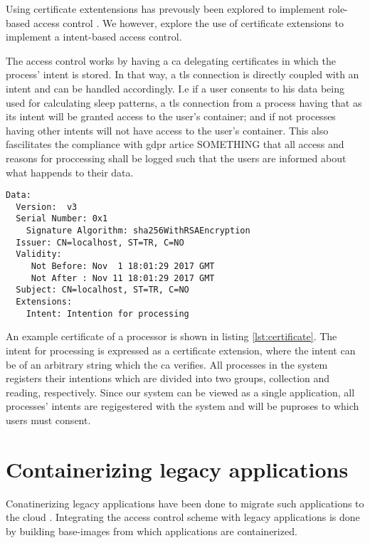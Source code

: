 \documentclass[USenglish]{uit-thesis}
\begin{document}
Using certificate extentensions has prevously been explored to implement role-based access control \cite{7095802, 1189190}.
We however, explore the use of certificate extensions to implement a intent-based access control.

The access control works by having a \gls{ca} delegating certificates in which the process'
intent is stored.
In that way, a \gls{tls} connection is directly coupled with an intent and can be
handled accordingly.
I.e if a user consents to his data being used for calculating sleep patterns, a \gls{tls}
connection from a process having that as its intent will be granted access to the user's
container; and if not processes having other intents will not have access to the user's container.
This also fascilitates the compliance with \gls{gdpr} artice SOMETHING that all access and reasons
for proccessing shall be logged such that the users are informed about what happends to their data.

\begin{lstlisting}[frame=single, caption={Intent certificate. Some fields are left out for brievity}, label={lst:certificate}]
    Data:
  Version:  v3
  Serial Number: 0x1
    Signature Algorithm: sha256WithRSAEncryption
  Issuer: CN=localhost, ST=TR, C=NO
  Validity:
     Not Before: Nov  1 18:01:29 2017 GMT
     Not After : Nov 11 18:01:29 2017 GMT
  Subject: CN=localhost, ST=TR, C=NO
  Extensions:
    Intent: Intention for processing
\end{lstlisting}

An example certificate of a processor is shown in listing \ref{lst:certificate}.
The intent for processing is expressed as a certificate extension, where the
intent can be of an arbitrary string which the \gls{ca} verifies.
All processes in the system registers their intentions which are divided into two
groups, collection and reading, respectively.
Since our system can be viewed as a single application, all processes' intents
are regigestered with the system and will be puproses to which users must consent.

\section{Containerizing legacy applications}
Conatinerizing legacy applications have been done to migrate
such applications to the cloud \cite{7092950}.
Integrating the access control scheme with legacy applications is done by
building base-images from which applications are containerized.
\end{document}
